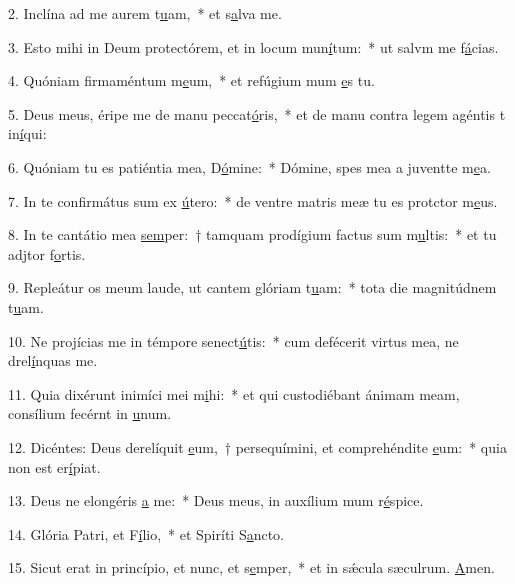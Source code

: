 2. Inclína ad me aurem t\uline{u}am,~* et s\uline{a}lva me.\par 
3. Esto mihi in Deum protectórem, et in locum mun\uline{í}tum:~* ut salvm me f\uline{á}cias.\par 
4. Quóniam firmaméntum m\uline{e}um,~* et refúgium mum \uline{e}s tu.\par 
5. Deus meus, éripe me de manu peccat\uline{ó}ris,~* et de manu contra legem agéntis t in\uline{í}qui:\par 
6. Quóniam tu es patiéntia mea, D\uline{ó}mine:~* Dómine, spes mea a juventte m\uline{e}a.\par 
7. In te confirmátus sum ex \uline{ú}tero:~* de ventre matris meæ tu es protctor m\uline{e}us.\par 
8. In te cantátio mea \uline{sem}per:~† tamquam prodígium factus sum m\uline{u}ltis:~* et tu adjtor f\uline{o}rtis.\par 
9. Repleátur os meum laude, ut cantem glóriam t\uline{u}am:~* tota die magnitúdnem t\uline{u}am.\par 
10. Ne projícias me in témpore senect\uline{ú}tis:~* cum defécerit virtus mea, ne drel\uline{í}nquas me.\par 
11. Quia dixérunt inimíci mei m\uline{i}hi:~* et qui custodiébant ánimam meam, consílium fecérnt in \uline{u}num.\par 
12. Dicéntes: Deus derelíquit \uline{e}um,~† persequímini, et comprehéndite \uline{e}um:~* quia non est  er\uline{í}piat.\par 
13. Deus ne elongéris \uline{a} me:~* Deus meus, in auxílium mum r\uline{é}spice.\par 
14. Glória Patri, et F\uline{í}lio,~* et Spiríti S\uline{a}ncto.\par 
15. Sicut erat in princípio, et nunc, et s\uline{e}mper,~* et in sǽcula sæculrum. \uline{A}men.\par 
